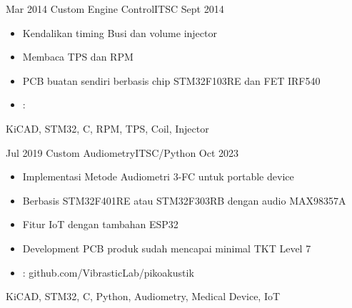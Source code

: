 %
%



\begin{experiences}


	\experience
	{Mar 2014}   {Custom Engine Control}{ITS}{C}
	{Sept 2014} {
	                  \begin{itemize}
	                    \item Kendalikan timing Busi dan volume injector
	                    \item Membaca TPS dan RPM
	                    \item PCB buatan sendiri berbasis chip STM32F103RE dan FET IRF540
	                    \item \faGithub: 
	                  \end{itemize}
	                }
	                {KiCAD, STM32, C, RPM, TPS, Coil, Injector}
	\emptySeparator

	\experience
	{Jul 2019} {Custom Audiometry}{ITS}{C/Python}
	{Oct 2023}    {
		\begin{itemize}
			\item Implementasi Metode Audiometri 3-FC untuk portable device
			\item Berbasis STM32F401RE atau STM32F303RB dengan audio MAX98357A
			\item Fitur IoT dengan tambahan ESP32
			\item Development PCB produk sudah mencapai minimal TKT Level 7
			\item \faGithub:  {github.com/VibrasticLab/pikoakustik}
		\end{itemize}
	}
	{KiCAD, STM32, C, Python, Audiometry, Medical Device, IoT}
	\emptySeparator

	

\end{experiences}
